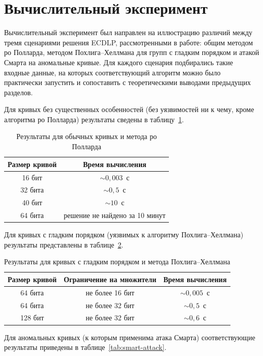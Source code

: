 \section{Вычислительный эксперимент}

Вычислительный эксперимент был направлен на иллюстрацию различий между тремя сценариями решения ECDLP, рассмотренными в работе: общим методом ро Полларда, методом Похлига--Хеллмана для групп с гладким порядком и атакой Смарта на аномальные кривые. Для каждого сценария подбирались такие входные данные, на которых соответствующий алгоритм можно было практически запустить и сопоставить с теоретическими выводами предыдущих разделов.

Для кривых без существенных особенностей (без уязвимостей ни к чему, кроме алгоритма ро Полларда) результаты сведены в таблицу~\ref{tab:pollard-rho}.

\begin{table}[htbp]
\centering
\begin{tabular}{|c|c|}
\hline
Размер кривой & Время вычисления \\
\hline
16 бит & $\sim 0{,}003$~с \\
32 бита & $\sim 0{,}5$~с \\
40 бит & $\sim 10$~с \\
64 бита & решение не найдено за 10 минут \\
\hline
\end{tabular}
\caption{Результаты для обычных кривых и метода ро Полларда}
\label{tab:pollard-rho}
\end{table}

Для кривых с гладким порядком (уязвимых к алгоритму Похлига--Хеллмана) результаты представлены в таблице~\ref{tab:pohlig-hellman}.

\begin{table}[htbp]
\centering
\begin{tabular}{|c|c|c|}
\hline
Размер кривой & Ограничение на множители & Время вычисления \\
\hline
64 бита & не более 16 бит & $\sim 0{,}005$~с \\
64 бита & не более 32 бит & $\sim 0{,}5$~с \\
128 бит & не более 32 бит & $\sim 0{,}6$~с \\
\hline
\end{tabular}
\caption{Результаты для кривых с гладким порядком и метода Похлига--Хеллмана}
\label{tab:pohlig-hellman}
\end{table}

Для аномальных кривых (к которым применима атака Смарта) соответствующие результаты приведены в таблице~\ref{tab:smart-attack}.

